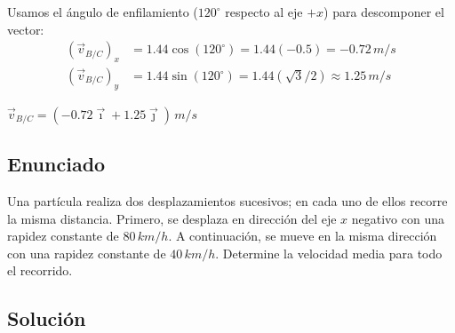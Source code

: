\documentclass[12pt, a4paper]{article}
\begin{document}
Usamos el ángulo de enfilamiento ($120^\circ$ respecto al eje $+x$) para descomponer el vector:
\begin{align*}
    (\vec{v}_{B/C})_x &= 1.44 \cos(120^\circ) = 1.44(-0.5) = -0.72 \, \si{m/s} \\
    (\vec{v}_{B/C})_y &= 1.44 \sin(120^\circ) = 1.44(\sqrt{3}/2) \approx 1.25 \, \si{m/s}
\end{align*}

\begin{tcolorbox}[colback=green!5!white, colframe=green!50!black, title=Respuesta Final]
\centering \Large $\vec{v}_{B/C} = (-0.72 \vec{\imath} + 1.25 \vec{\jmath}) \, \si{m/s}$
\end{tcolorbox}

\newpage

\subsection*{Enunciado}

Una partícula realiza dos desplazamientos sucesivos; en cada uno de ellos recorre la misma distancia. Primero, se desplaza en dirección del eje $x$ negativo con una rapidez constante de $80 \, \si{km/h}$. A continuación, se mueve en la misma dirección con una rapidez constante de $40 \, \si{km/h}$. Determine la velocidad media para todo el recorrido.

\begin{center}
\end{center}

\subsection*{Solución}
\end{document}
